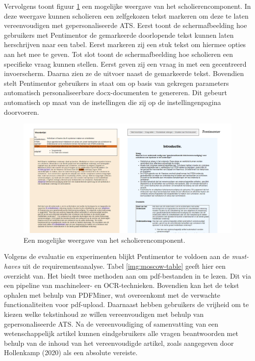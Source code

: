 Vervolgens toont figuur \ref{img:pentimentor-afbeelding} een mogelijke weergave van het scholierencomponent. In deze weergave kunnen scholieren een zelfgekozen tekst markeren om deze te laten vereenvoudigen met gepersonaliseerde ATS. Eerst toont de schermafbeelding hoe gebruikers met Pentimentor de gemarkeerde doorlopende tekst kunnen laten herschrijven naar een tabel. Eerst markeren zij een stuk tekst om hiermee opties aan het mee te geven. Tot slot toont de schermafbeelding hoe scholieren een specifieke vraag kunnen stellen. Eerst geven zij een vraag in met een gecentreerd invoerscherm. Daarna zien ze de uitvoer naast de gemarkeerde tekst. Bovendien stelt Pentimentor gebruikers in staat om op basis van gekregen parameters automatisch personaliseerbare docx-documenten te genereren. Dit gebeurt automatisch op maat van de instellingen die zij op de instellingenpagina doorvoeren.

\begin{center}
	\begin{figure}[H]
		\includegraphics[width=\linewidth]{img/pentimentor-afbeelding}
		\caption{Een mogelijke weergave van het scholierencomponent.}
		\label{img:pentimentor-afbeelding}
	\end{figure}
\end{center}

Volgens de evaluatie en experimenten blijkt Pentimentor te voldoen aan de \textit{must-haves} uit de requirementsanalyse. Tabel \ref{img:moscow-table} geeft hier een overzicht van. Het biedt twee methoden aan om pdf-bestanden in te lezen. Dit via een pipeline van machineleer- en OCR-technieken. Bovendien kan het de tekst ophalen met behulp van PDFMiner, wat overeenkomt met de verwachte functionaliteiten voor pdf-upload. Daarnaast hebben gebruikers de vrijheid om te kiezen welke tekstinhoud ze willen vereenvoudigen met behulp van gepersonaliseerde ATS. Na de vereenvoudiging of samenvatting van een wetenschappelijk artikel kunnen eindgebruikers alle vragen beantwoorden met behulp van de inhoud van het vereenvoudigde artikel, zoals aangegeven door Hollenkamp (2020) als een absolute vereiste.

